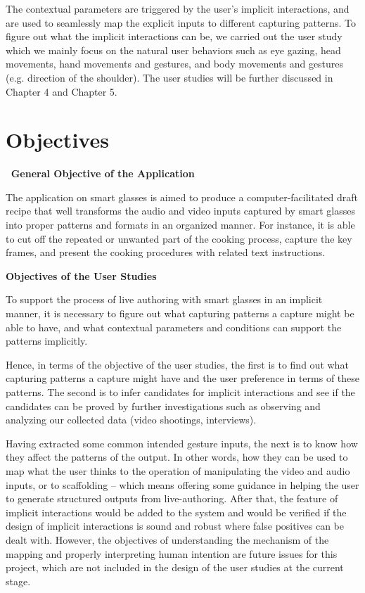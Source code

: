 \documentclass[fyp]{socreport}
\begin{document}
The contextual parameters are triggered by the user’s implicit interactions, and are used to seamlessly map the explicit inputs to different capturing patterns. To figure out what the implicit interactions can be, we carried out the user study which we mainly focus on the natural user behaviors such as eye gazing, head movements, hand movements and gestures, and body movements and gestures (e.g. direction of the shoulder). The user studies will be further discussed in Chapter 4 and Chapter 5.

\section{Objectives}
\quad\textbf{\, General Objective of the Application}

The application on smart glasses is aimed to produce a computer-facilitated draft recipe that well transforms the audio and video inputs captured by smart glasses into proper patterns and formats in an organized manner. For instance, it is able to cut off the repeated or unwanted part of the cooking process, capture the key frames, and present the cooking procedures with related text instructions.

\textbf{Objectives of the User Studies}

To support the process of live authoring with smart glasses in an implicit manner, it is necessary to figure out what capturing patterns a capture might be able to have, and what contextual parameters and conditions can support the patterns implicitly.

Hence, in terms of the objective of the user studies, the first is to find out what capturing patterns a capture might have and the user preference in terms of these patterns. The second is to infer candidates for implicit interactions and see if the candidates can be proved by further investigations such as observing and analyzing our collected data (video shootings, interviews). 

Having extracted some common intended gesture inputs, the next is to know how they affect the patterns of the output. In other words, how they can be used to map what the user thinks to the operation of manipulating the video and audio inputs, or to scaffolding -- which means offering some guidance in helping the user to generate structured outputs from live-authoring. After that, the feature of implicit interactions would be added to the system and would be verified if the design of implicit interactions is sound and robust where false positives can be dealt with. However, the objectives of understanding the mechanism of the mapping and properly interpreting human intention are future issues for this project, which are not included in the design of the user studies at the current stage.
\end{document}
